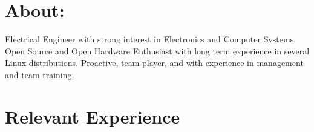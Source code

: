 \documentclass[a4paper]{twentysecondcv} %
\begin{document}
\makeprofile %
 
\section{About: }
\small{Electrical Engineer with strong interest in Electronics and Computer Systems. Open Source and Open Hardware Enthusiast with long term experience in several Linux distributions. Proactive, team-player, and with experience in management and team training.}

\section{Relevant Experience}
\end{document}
